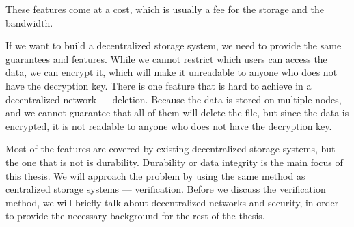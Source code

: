 These features come at a cost, which is usually a fee for the storage and the bandwidth.

If we want to build a decentralized storage system, we need to provide the same guarantees and features.
While we cannot restrict which users can access the data, we can encrypt it,
which will make it unreadable to anyone who does not have the decryption key.
There is one feature that is hard to achieve in a decentralized network --- deletion.
Because the data is stored on multiple nodes, and we cannot guarantee that all of them will delete the file,
but since the data is encrypted, it is not readable to anyone who does not have the decryption key.

Most of the features are covered by existing decentralized storage systems, but the one that is not is durability.
Durability or data integrity is the main focus of this thesis.
We will approach the problem by using the same method as centralized storage systems --- verification.
Before we discuss the verification method, we will briefly talk about decentralized networks and security,
in order to provide the necessary background for the rest of the thesis.

